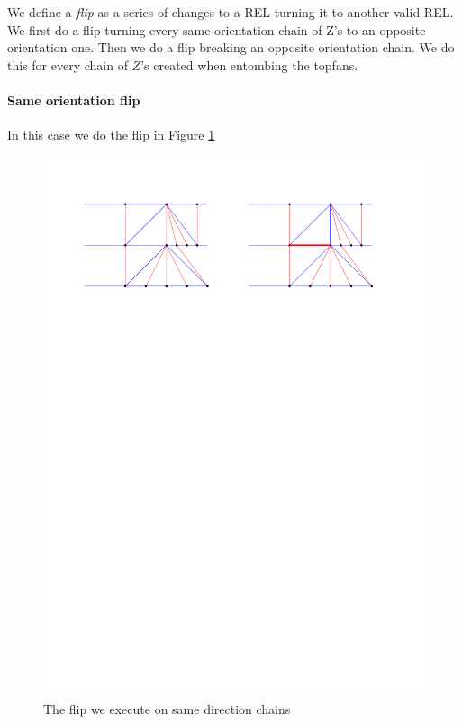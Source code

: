     We define a \emph{flip} as a series of changes to a REL turning it to another valid REL.
    We first do a flip turning every same orientation chain of Z's to an opposite orientation one. Then we do a flip breaking an opposite orientation chain. We do this for every chain of $Z$'s created when entombing the topfans.  


  \paragraph{Same orientation flip}

  In this case we do the flip in Figure \ref{fig:uni:sameFlip}

  \begin{figure}[h]
    \centering
    \includegraphics[width =\textwidth]{unifiedAlgo/img/post/sameFlip}
    \caption{The flip we execute on same direction chains}
    \label{fig:uni:sameFlip}
  \end{figure}

